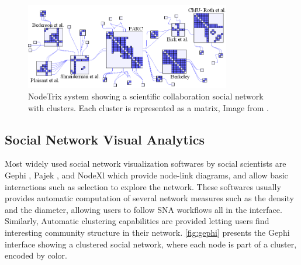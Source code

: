 \begin{figure}
    \centering %
    \includegraphics[width=0.8\textwidth]{static/figures/RelatedWork/NodeTrix.png}
    \caption{NodeTrix system showing a scientific collaboration social network with clusters. Each cluster is represented as a matrix,  Image from \cite{henryNodeTrixHybridVisualization2007}.}
    \label{fig:Riche-NodeTrix}
\end{figure}


\subsection{Social Network Visual Analytics}

Most widely used social network visualization softwares by social scientists are Gephi \cite{Gephi}, Pajek \cite{mrvarAnalysisVisualizationLarge2016}, and NodeXl \cite{NodeXL} which provide node-link diagrams, and allow basic interactions such as selection to explore the network.
These softwares usually provides automatic computation of several network measures such as the density and the diameter, allowing users to follow SNA workflows all in the interface.
Similarly, Automatic clustering capabilities are provided letting users find interesting community structure in their network.
\autoref{fig:gephi} presents the Gephi interface showing a clustered social network, where each node is part of a cluster, encoded by color.

